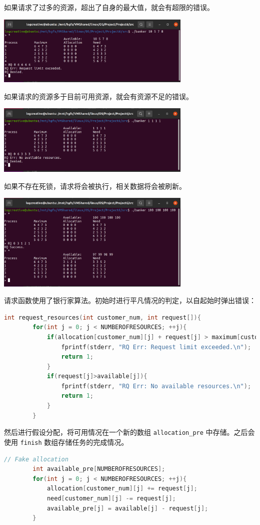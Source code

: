 \documentclass[12pt,a4paper]{article}
\newenvironment{problems}{\begin{list}{}{\renewcommand{\makelabel}[1]{\textbf{##1}\hfil}}}{\end{list}}
\begin{document}
\begin{problems}
    如果请求了过多的资源，超出了自身的最大值，就会有超限的错误。

    \includegraphics[width=0.7\textwidth]{RQe.png}

    如果请求的资源多于目前可用资源，就会有资源不足的错误。

    \includegraphics[width=0.7\textwidth]{RQa.png}
    
    如果不存在死锁，请求将会被执行，相关数据将会被刷新。

    \includegraphics[width=0.7\textwidth]{RQs.png}

    请求函数使用了银行家算法。初始时进行平凡情况的判定，以自起始时弹出错误：
    \begin{lstlisting}[language=c]
    int request_resources(int customer_num, int request[]){
        for(int j = 0; j < NUMBEROFRESOURCES; ++j){
            if(allocation[customer_num][j] + request[j] > maximum[customer_num][j]){
                fprintf(stderr, "RQ Err: Request limit exceeded.\n");
                return 1;
            }
            if(request[j]>available[j]){
                fprintf(stderr, "RQ Err: No available resources.\n");
                return 1;
            }
        }
    \end{lstlisting}

    然后进行假设分配，将可用情况在一个新的数组 \verb"allocation_pre" 中存储。之后会使用 \verb"finish" 数组存储任务的完成情况。
    \begin{lstlisting}[language=c]
        // Fake allocation
        int available_pre[NUMBEROFRESOURCES];
        for(int j = 0; j < NUMBEROFRESOURCES; ++j){
            allocation[customer_num][j] += request[j];
            need[customer_num][j] -= request[j];
            available_pre[j] = available[j] - request[j];
        }
        

\end{lstlisting}
\end{problems}
\end{document}
